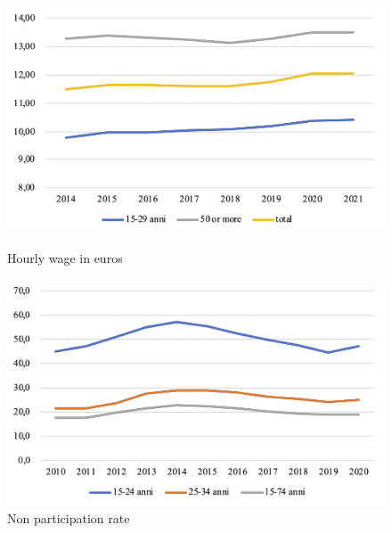 \documentclass[12pt]{article}
\begin{document}
\begin{spacing}{1.5}
\begin{figure}
	\begin{minipage}[b]{0.5\textwidth}
		\begin{center}
			\includegraphics[width=\textwidth]{./images/hourly-wage-age.png}
		\end{center}
			\caption{Hourly wage in euros}
	\end{minipage}
	\begin{minipage}[b]{0.5\textwidth}
		\begin{center}
			\includegraphics[width=\textwidth]{./images/non-participation-age.png}
		\end{center}
			\caption{Non participation rate}
	\end{minipage}
\end{figure}


\end{spacing}
\end{document}
